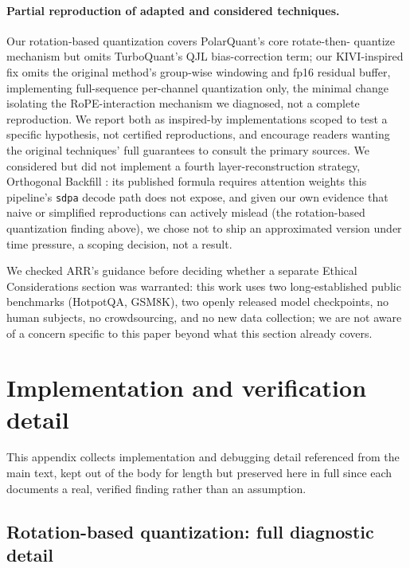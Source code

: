 \documentclass[11pt]{article}
\begin{document}
\paragraph{Partial reproduction of adapted and considered techniques.}
Our rotation-based quantization covers PolarQuant's core rotate-then-
quantize mechanism but omits TurboQuant's QJL bias-correction term; our
KIVI-inspired fix omits the original method's group-wise windowing and
fp16 residual buffer, implementing full-sequence per-channel quantization
only, the minimal change isolating the RoPE-interaction mechanism we
diagnosed, not a complete reproduction. We report both as inspired-by
implementations scoped to test a specific hypothesis, not certified
reproductions, and encourage readers wanting the original techniques'
full guarantees to consult the primary sources. We considered but did not
implement a fourth layer-reconstruction strategy, Orthogonal Backfill
\citep{orthobackfill2026}: its published formula requires attention
weights this pipeline's \texttt{sdpa} decode path does not expose, and
given our own evidence that naive or simplified reproductions can
actively mislead (the rotation-based quantization finding above), we
chose not to ship an approximated version under time pressure, a scoping
decision, not a result.

We checked ARR's guidance before deciding whether a separate Ethical
Considerations section was warranted: this work uses two long-established
public benchmarks (HotpotQA, GSM8K), two openly released model
checkpoints, no human subjects, no crowdsourcing, and no new data
collection; we are not aware of a concern specific to this paper beyond
what this section already covers.




\appendix

\section{Implementation and verification detail}

This appendix collects implementation and debugging detail referenced
from the main text, kept out of the body for length but preserved here
in full since each documents a real, verified finding rather than an
assumption.

\subsection{Rotation-based quantization: full diagnostic detail}
\label{app:rotation}
\end{document}

